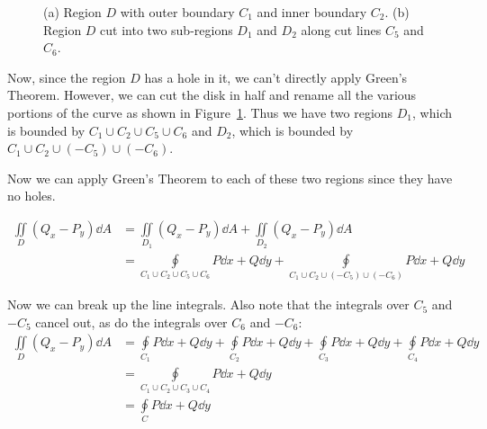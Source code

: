\begin{figure}[htpb]
\begin{subfigure}{0.4\textwidth}
        \caption{}
        \label{fig:greens-theorem-holes-b}
    \end{subfigure}
    \caption{(a) Region $D$ with outer boundary $C_1$ and inner boundary $C_2$. (b) Region $D$ cut into two sub-regions $D_1$ and $D_2$ along cut lines $C_5$ and $C_6$.}
    \label{fig:greens-theorem-holes}
\end{figure}

Now, since the region $D$ has a hole in it, we can't directly apply Green's Theorem. However, we can cut the disk in half and rename all the various portions of the curve as shown in Figure~\ref{fig:greens-theorem-holes-b}. Thus we have two regions $D_1$, which is bounded by $C_1 \cup C_2 \cup C_5 \cup C_6$ and $D_2$, which is bounded by $C_1 \cup C_2 \cup (-C_5) \cup (-C_6)$.

Now we can apply Green's Theorem to each of these two regions since they have no holes.

\begin{align*}
    \iint \limits_{D} (Q_x-P_y) \dd{A} &= \iint \limits_{D_1} (Q_x-P_y) \dd{A} + \iint \limits_{D_2} (Q_x-P_y) \dd{A} \\
                                       &= \oint \limits_{C_1 \cup C_2 \cup C_5 \cup C_6} P \dd{x} + Q \dd{y} + \oint \limits_{C_1 \cup C_2 \cup (-C_5) \cup (-C_6)} P \dd{x} + Q \dd{y}
\end{align*}

Now we can break up the line integrals. Also note that the integrals over $C_5$ and $-C_5$ cancel out, as do the integrals over $C_6$ and $-C_6$:
\begin{align*}
    \iint \limits_{D} (Q_x-P_y) \dd{A} &= \oint \limits_{C_1} P \dd{x} + Q \dd{y} + \oint \limits_{C_2} P \dd{x} + Q \dd{y} + \oint \limits_{C_3} P \dd{x} + Q \dd{y} + \oint \limits_{C_4} P \dd{x} + Q \dd{y} \\
                                       &= \oint \limits_{C_1 \cup C_2 \cup C_3 \cup C_4} P \dd{x}+ Q \dd{y} \\
                                       &= \oint \limits_{C} P \dd{x} + Q \dd{y}
\end{align*}

